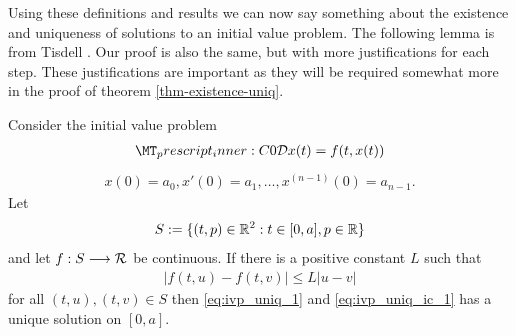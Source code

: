 Using these definitions and results we can now say something about the existence and uniqueness of solutions to an initial value problem. The following lemma is from Tisdell \cite{Tisdell2012}. Our proof is also the same, but with more justifications for each step. These justifications are important as they will be required somewhat more in the proof of theorem \ref{thm-existence-uniq}.

\begin{mdframed}[innertopmargin=10pt]
\begin{theorem}[Uniqueness]
    \label{thm:unique-tisdell}
    Consider the initial value problem 
    \begin{align}
        \label{eq:ivp_uniq_1}    
        \prescript{C}{0}{\mathcal{D}}x(t) = f(t,x(t))
    \end{align}
    \begin{align}
        \label{eq:ivp_uniq_ic_1}
        x(0) = a_0, x'(0) = a_1, \ldots, x^{(n-1)}(0) = a_{n-1}.
    \end{align}
    Let 
	\begin{align*}
	    S:= \{ (t,p) \in \mathbb{R}^2 : t \in [0, a], p \in \mathbb{R} \} 
	\end{align*}
	and let $ f : S \longrightarrow \mathcal{R} $ be continuous. If there is a positive constant $ L $ such that 
	\begin{align}
		\label{eq:ivp_uniq_1_lipshitz}
	    |f(t,u) - f(t,v)| \leq L|u-v| 
	\end{align}   
	for all $ (t,u), (t,v) \in S $
	then \eqref{eq:ivp_uniq_1} and \eqref{eq:ivp_uniq_ic_1} has a unique solution on $ [0, a] $.
\end{theorem}
\end{mdframed}
